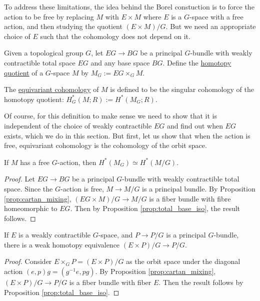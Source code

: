 To address these limitations, the idea behind the Borel constuction is to force 
the action to be free by replacing  $M$ with  $E\times M$ where $E$ is a  
$G$-space with a free action, and then studying the quotient  $(E\times M) /G$. 
But we need an appropriate choice of $E$ such that the cohomology does not 
depend on it.

\begin{defn}
	Given a topological group $G$, let  $EG \to BG$ be a principal  $G$-bundle
	with weakly contractible total space  $EG$ and any base space $BG$. 
	Define the  \underline{homotopy
	quotient} of a $G$-space $M$ by $M_G:=EG\times_G M$.
	 
	The \underline{equivariant cohomology} of $M$ is defined to be the singular
	cohomology of the homotopy quotient: $H_G^*(M;R) := H^*(M_G;R)$.
\end{defn}
Of course, for this definition to make sense we need to show that it is
independent of the choice of weakly contractible $EG$ and find out when $EG$ 
exists, which we do in this section. But first, let us show that when the action 
is free, equivariant cohomology is the cohomology of the orbit space.
\begin{prop} \label{prop:free_action_cohomology}
	If $M$ has a free  $G$-action, then $H^*(M_G)\simeq H^*(M /G)$. 
\end{prop}
\begin{proof}
	Let $EG \to BG$ be a principal  $G$-bundle with weakly contractible total
	space. Since the $G$-action is free,  $M \to M /G$ is a principal bundle.
	By Proposition \ref{prop:cartan_mixing}, 
	$(EG\times M) /G \to M /G$ is a fiber bundle with
	fibre homeomorphic to $EG$. Then by Proposition \ref{prop:total_base_iso},
	the result follows.
\end{proof}

\begin{lem} %
	If $E$ is a weakly contractible $G$-space, and $P\to P/G$ is a principal
	$G$-bundle, there is a weak homotopy equivalence $(E\times P) /G \to P /G$.  
\end{lem}
\begin{proof}
	Consider $E\times_G P = (E\times P) /G$ as the orbit space under 
	the diagonal action $(e,p)g = (g^{-1}e,pg)$. 
	By Proposition \ref{prop:cartan_mixing}, $(E\times P) /G \to P /G$ is a
	fiber bundle with fiber $E$. Then the result follows by Proposition
	\ref{prop:total_base_iso}.
\end{proof}

